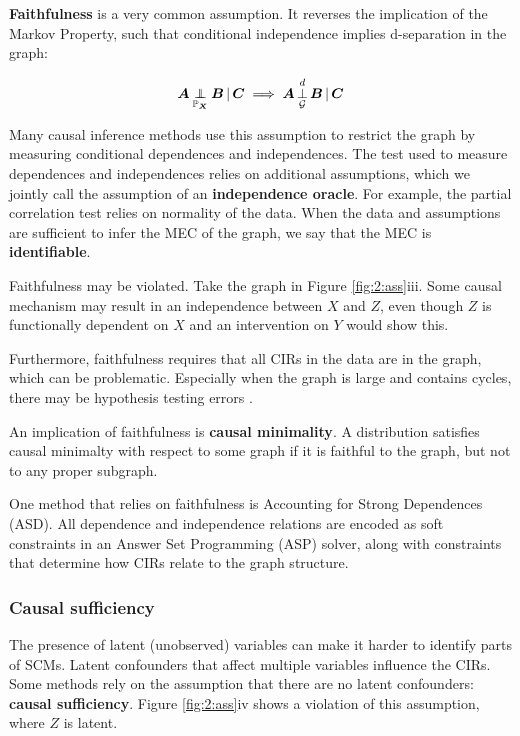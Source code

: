 \textbf{Faithfulness} is a very common assumption. It reverses the implication of the Markov Property, such that conditional independence implies d-separation in the graph:

$$\indep{\B{A}}{\B{B}}{\B{C}}{\Prb_{\B{X}}} \implies \dsep{\B{A}}{\B{B}}{\B{C}}{\C{G}}$$

Many causal inference methods use this assumption to restrict the graph by measuring conditional dependences and independences. The test used to measure dependences and independences relies on additional assumptions, which we jointly call the assumption of an \textbf{independence oracle}. For example, the partial correlation test relies on normality of the data. When the data and assumptions are sufficient to infer the MEC of the graph, we say that the MEC is \textbf{identifiable}.

Faithfulness may be violated. Take the graph in Figure \ref{fig:2:ass}iii. Some causal mechanism may result in an independence between $X$ and $Z$, even though $Z$ is functionally dependent on $X$ and an intervention on $Y$ would show this.

Furthermore, faithfulness requires that all CIRs in the data are in the graph, which can be problematic. Especially when the graph is large and contains cycles, there may be hypothesis testing errors \citep{uhler2013geometry}.


An implication of faithfulness is \textbf{causal minimality}. A distribution satisfies causal minimalty with respect to some graph if it is faithful to the graph, but not to any proper subgraph. 

One method that relies on faithfulness is Accounting for Strong Dependences (ASD). All dependence and independence relations are encoded as soft constraints in an Answer Set Programming (ASP) solver, along with constraints that determine how CIRs relate to the graph structure.

\subsubsection{Causal sufficiency}

The presence of latent (unobserved) variables can make it harder to identify parts of SCMs. Latent confounders that affect multiple variables influence the CIRs. Some methods rely on the assumption that there are no latent confounders: \textbf{causal sufficiency}. Figure \ref{fig:2:ass}iv shows a violation of this assumption, where $Z$ is latent.

